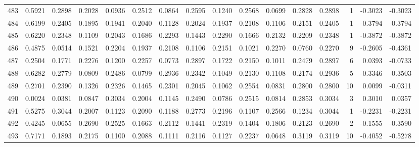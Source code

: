 \begin{tabular}{lrrrrrrrrrrrrrrr}
483 &      0.5921 &  0.2898 &  0.2028 &  0.0936 &  0.2512 &  0.0864 &  0.2595 &  0.1240 &  0.2568 &  0.0699 &   0.2828 &     0.2898 &      1 &                   -0.3023 &                    -0.3023 \\
484 &      0.6199 &  0.2405 &  0.1895 &  0.1941 &  0.2040 &  0.1128 &  0.2024 &  0.1937 &  0.2108 &  0.1106 &   0.2151 &     0.2405 &      1 &                   -0.3794 &                    -0.3794 \\
485 &      0.6220 &  0.2348 &  0.1109 &  0.2043 &  0.1686 &  0.2293 &  0.1443 &  0.2290 &  0.1666 &  0.2132 &   0.2209 &     0.2348 &      1 &                   -0.3872 &                    -0.3872 \\
486 &      0.4875 &  0.0514 &  0.1521 &  0.2204 &  0.1937 &  0.2108 &  0.1106 &  0.2151 &  0.1021 &  0.2270 &   0.0760 &     0.2270 &      9 &                   -0.2605 &                    -0.4361 \\
487 &      0.2504 &  0.1771 &  0.2276 &  0.1200 &  0.2257 &  0.0773 &  0.2897 &  0.1722 &  0.2150 &  0.1011 &   0.2479 &     0.2897 &      6 &                    0.0393 &                    -0.0733 \\
488 &      0.6282 &  0.2779 &  0.0809 &  0.2486 &  0.0799 &  0.2936 &  0.2342 &  0.1049 &  0.2130 &  0.1108 &   0.2174 &     0.2936 &      5 &                   -0.3346 &                    -0.3503 \\
489 &      0.2701 &  0.2390 &  0.1326 &  0.2326 &  0.1465 &  0.2301 &  0.2045 &  0.1062 &  0.2554 &  0.0831 &   0.2800 &     0.2800 &     10 &                    0.0099 &                    -0.0311 \\
490 &      0.0024 &  0.0381 &  0.0847 &  0.3034 &  0.2004 &  0.1145 &  0.2490 &  0.0786 &  0.2515 &  0.0814 &   0.2853 &     0.3034 &      3 &                    0.3010 &                     0.0357 \\
491 &      0.5275 &  0.3044 &  0.2007 &  0.1123 &  0.2090 &  0.1188 &  0.2773 &  0.2196 &  0.1107 &  0.2566 &   0.1234 &     0.3044 &      1 &                   -0.2231 &                    -0.2231 \\
492 &      0.4245 &  0.0655 &  0.2690 &  0.2525 &  0.1663 &  0.2112 &  0.1441 &  0.2319 &  0.1404 &  0.1806 &   0.2123 &     0.2690 &      2 &                   -0.1555 &                    -0.3590 \\
493 &      0.7171 &  0.1893 &  0.2175 &  0.1100 &  0.2088 &  0.1111 &  0.2116 &  0.1127 &  0.2237 &  0.0648 &   0.3119 &     0.3119 &     10 &                   -0.4052 &                    -0.5278 \\

\end{tabular}

